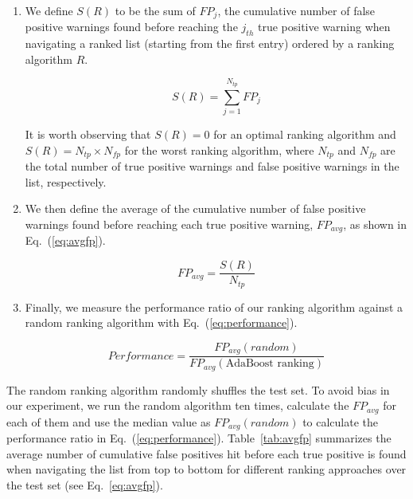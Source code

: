 \begin{enumerate}

\item We define $S(R)$ to be the
sum of $FP_j$, the cumulative number of false positive warnings found before
reaching the $j_{th}$ true positive warning when navigating a ranked list
(starting from the first entry) ordered by a ranking algorithm $R$.

\begin{equation}\label{eq:sr}
  S\left(R\right) = \sum\limits_{j=1}^{N_{tp}} \mathit{FP}_j
\end{equation}

It is worth observing that $S\left(R\right) = 0$ for an optimal ranking algorithm and
$S\left(R\right) = N_{tp} \times N_{fp}$ for the worst ranking algorithm, where $N_{tp}$
and $N_{fp}$ are the total number of true positive warnings and false positive
warnings in the list, respectively.

\item We then define the average of the cumulative number of false positive
warnings found before reaching each true positive warning, $\mathit{FP}_{avg}$, as shown
in Eq.~(\ref{eq:avgfp}).

\begin{equation}\label{eq:avgfp}
  \mathit{FP}_{avg} = \frac{S\left(R\right)}{N_{tp}}
\end{equation}

\item Finally, we measure the performance ratio of our ranking algorithm against a random
ranking algorithm with Eq.~(\ref{eq:performance}).

\begin{equation}\label{eq:performance}
  \mathit{Performance} = \frac{\mathit{FP}_{avg}(\mathit{random})}{\mathit{FP}_{avg}(\text{AdaBoost ranking})}
\end{equation}

\end{enumerate}

The random ranking algorithm randomly shuffles the test set. To avoid bias in
our experiment, we run the random algorithm ten times, calculate the
$\mathit{FP}_{avg}$ for each of them and use the median value as
$\mathit{FP}_{avg}(\mathit{random})$ to calculate the performance ratio in
Eq.~(\ref{eq:performance}). Table~\ref{tab:avgfp} summarizes the average number
of cumulative false positives hit before each true positive is found when
navigating the list from top to bottom for different ranking approaches
over the test set (see Eq.~\ref{eq:avgfp}).

